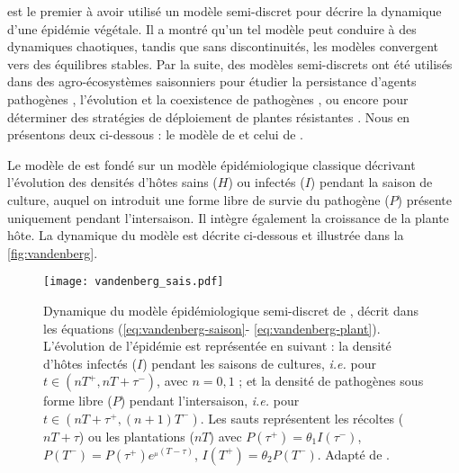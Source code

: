 	\citet{Shaw1994} est le premier à avoir utilisé un modèle semi-discret pour décrire la dynamique d'une épidémie végétale. Il a montré qu'un tel modèle peut conduire à des dynamiques chaotiques, tandis que sans discontinuités, les modèles convergent vers des équilibres stables. Par la suite, des modèles semi-discrets ont été utilisés dans des agro-écosystèmes saisonniers pour étudier la persistance d'agents pathogènes \citep{Madden2002}, l'évolution et la coexistence de pathogènes \citep{Vandenberg2010,Vandenberg2011,Hamelin2011,Mailleret2012}, ou encore pour déterminer des stratégies de déploiement de plantes résistantes \citep{Fabre2012,Fabre2015}. Nous en présentons deux ci-dessous : le modèle de  \citet{Vandenberg2011} et celui de \citet{Mailleret2012}.
	
	
	
	Le modèle de \citet{Vandenberg2011} est fondé sur un modèle épidémiologique classique décrivant l'évolution des densités d'hôtes sains ($H$) ou infectés ($I$) pendant la saison de culture, auquel on introduit une forme libre de survie du pathogène ($P$) présente uniquement pendant l'intersaison. Il intègre également la croissance de la plante hôte. La dynamique du modèle est décrite ci-dessous et illustrée dans la \autoref{fig:vandenberg}.
	
	\begin{figure}[ht]
	  \centering
	  \texttt{[image: vandenberg\_sais.pdf]}
	  \caption[Dynamique du modèle épidémiologique semi-discret de \citet{Vandenberg2011}]{Dynamique du modèle 
	  épidémiologique semi-discret de \citet{Vandenberg2011}, décrit dans les équations (\ref{eq:vandenberg-saison}-
	  \ref{eq:vandenberg-plant}). L'évolution de l'épidémie est représentée en suivant : la densité d'hôtes infectés 
	  ($I$) pendant les saisons de cultures, \textit{i.e.} pour $t\in(nT^+,nT+\tau^-)$, avec $n=0,1$ ; et la densité de 
	  pathogènes sous forme libre ($P$) pendant l'intersaison, \textit{i.e.} pour $t\in(nT+\tau^+,(n+1)T^-)$. Les sauts 
	  représentent les récoltes ($nT+\tau$) ou les plantations ($nT$) avec $P(\tau^+)=\theta_1 I(\tau^-)$, 
	  $P(T^-)=P(\tau^+)e^{_\mu(T-\tau)}$, $I(T^+)=\theta_2P(T^-)$. 
	   Adapté de \citet{Vandenberg2011}.}
	  \label{fig:vandenberg}
	\end{figure}
	
